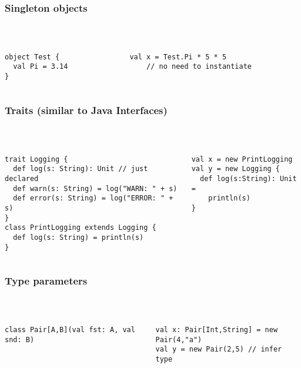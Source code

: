\documentclass[aspectratio=169]{beamer}
\begin{document}
\begin{frame}[fragile]\frametitle{Singleton objects}
~\\[-8mm]
\begin{columns}
\begin{column}{0.44\textwidth}
\begin{lstlisting}
object Test {
  val Pi = 3.14
}
\end{lstlisting}
\end{column}
\begin{column}{0.52\textwidth}
\begin{lstlisting}
val x = Test.Pi * 5 * 5
    // no need to instantiate
\end{lstlisting}%
\end{column}
\end{columns}
\end{frame}


\begin{frame}[fragile]\frametitle{Traits (similar to Java Interfaces)}    
~\\[-8mm]
\begin{columns}
\begin{column}{0.58\textwidth}
\begin{lstlisting}
trait Logging {
  def log(s: String): Unit // just declared
  def warn(s: String) = log("WARN: " + s)
  def error(s: String) = log("ERROR: " + s)
}
class PrintLogging extends Logging {
  def log(s: String) = println(s)
}
\end{lstlisting}
\end{column}
\begin{column}{0.40\textwidth}
\begin{lstlisting}
val x = new PrintLogging
val y = new Logging {
  def log(s:String): Unit =
    println(s)
}
\end{lstlisting}%
\end{column}
\end{columns}
\end{frame}


\begin{frame}[fragile]\frametitle{Type parameters}    
~\\[-8mm]
\begin{columns}
\begin{column}{0.58\textwidth}
\begin{lstlisting}
class Pair[A,B](val fst: A, val snd: B)
\end{lstlisting}
\end{column}
\begin{column}{0.40\textwidth}
\begin{lstlisting}
val x: Pair[Int,String] = new Pair(4,"a")
val y = new Pair(2,5) // infer type
\end{lstlisting}%
\end{column}
\end{columns}
\end{frame}
\end{document}
